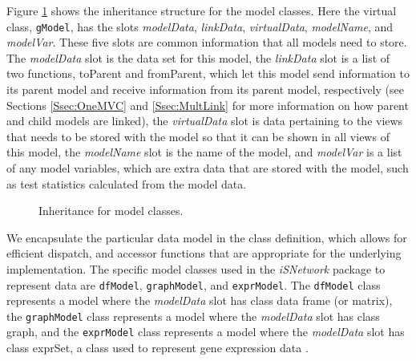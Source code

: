 \documentclass{article}[11pt]
\newcommand{\Rfunction}[1]{{\textsf{#1}}}
\newcommand{\Rpackage}[1]{{\textit{#1}}}
\newcommand{\Rslot}[1]{\textsl{#1}}
\newcommand{\Rclass}[1]{\texttt{#1}}
\begin{document}
Figure \ref{Fig:Model} shows the inheritance structure for the model
classes.  Here the virtual class, \Rclass{gModel}, has the slots
\Rslot{modelData}, \Rslot{linkData}, \Rslot{virtualData}, \Rslot{modelName},
and \Rslot{modelVar}.  These five slots are common information that all models
need to store.  The \Rslot{modelData} slot is the data set for this model, the
\Rslot{linkData} slot is a list of two functions, \Rfunction{toParent} and
\Rfunction{fromParent}, which let this model send information to its parent
model and receive information from its parent model, respectively (see
Sections \ref{Ssec:OneMVC} and \ref{Ssec:MultLink} for more information on how
parent and child models are linked), the \Rslot{virtualData} slot is data
pertaining to the views that needs to be stored with the model so that it can
be shown in all views of this model, the \Rslot{modelName} slot is the
name of the model, and \Rslot{modelVar} is a list of any model variables,
which are extra data that are stored with the model, such as test statistics
calculated from the model data.  

\begin{figure}[ht]
  \begin{center}
    \caption{ Inheritance for model classes. }
    \label{Fig:Model}
  \end{center}
\end{figure}

We encapsulate the particular data model in the class definition, which allows
for efficient dispatch, and accessor functions that are appropriate for the
underlying implementation.  The specific model classes used in the
\Rpackage{iSNetwork} package to represent data are \Rclass{dfModel},
\Rclass{graphModel}, and \Rclass{exprModel}.  The \Rclass{dfModel} class
represents a model where the \Rslot{modelData} slot has class data frame (or
matrix), the \Rclass{graphModel} class represents a model where the
\Rslot{modelData} slot has class graph, and the \Rclass{exprModel} class
represents a model where the \Rslot{modelData} slot has class exprSet, a class
used to represent gene expression data \cite{BioC}.
\end{document}

